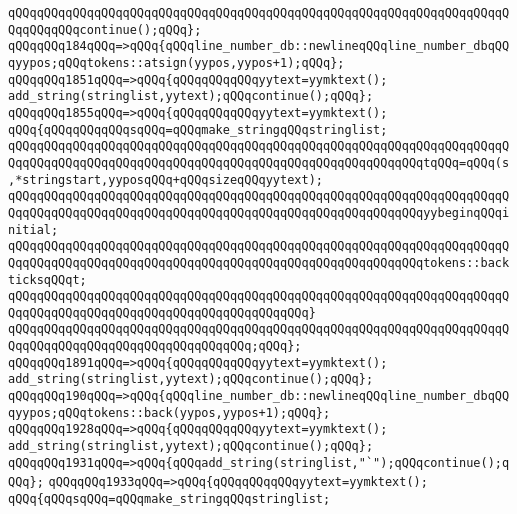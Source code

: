 \verb|qQQqqQQqqQQqqQQqqQQqqQQqqQQqqQQqqQQqqQQqqQQqqQQqqQQqqQQqqQQqqQQqqQQqqQQqqQQqqQQqcontinue();qQQq};|\newline
\verb|qQQqqQQq184qQQq=>qQQq{qQQqline_number_db::newlineqQQqline_number_dbqQQqyypos;qQQqtokens::atsign(yypos,yypos+1);qQQq};|\newline
\verb|qQQqqQQq1851qQQq=>qQQq{qQQqqQQqqQQqyytext=yymktext();|\newline
\verb|add_string(stringlist,yytext);qQQqcontinue();qQQq};|\newline
\verb|qQQqqQQq1855qQQq=>qQQq{qQQqqQQqqQQqyytext=yymktext();|\newline
\verb|qQQq{qQQqqQQqqQQqsqQQq=qQQqmake_stringqQQqstringlist;|\newline
\verb|qQQqqQQqqQQqqQQqqQQqqQQqqQQqqQQqqQQqqQQqqQQqqQQqqQQqqQQqqQQqqQQqqQQqqQQqqQQqqQQqqQQqqQQqqQQqqQQqqQQqqQQqqQQqqQQqqQQqqQQqqQQqqQQqtqQQq=qQQq(s,*stringstart,yyposqQQq+qQQqsizeqQQqyytext);|\newline
\verb|qQQqqQQqqQQqqQQqqQQqqQQqqQQqqQQqqQQqqQQqqQQqqQQqqQQqqQQqqQQqqQQqqQQqqQQqqQQqqQQqqQQqqQQqqQQqqQQqqQQqqQQqqQQqqQQqqQQqqQQqqQQqqQQqyybeginqQQqinitial;|\newline
\verb|qQQqqQQqqQQqqQQqqQQqqQQqqQQqqQQqqQQqqQQqqQQqqQQqqQQqqQQqqQQqqQQqqQQqqQQqqQQqqQQqqQQqqQQqqQQqqQQqqQQqqQQqqQQqqQQqqQQqqQQqqQQqqQQqtokens::backticksqQQqt;|\newline
\verb|qQQqqQQqqQQqqQQqqQQqqQQqqQQqqQQqqQQqqQQqqQQqqQQqqQQqqQQqqQQqqQQqqQQqqQQqqQQqqQQqqQQqqQQqqQQqqQQqqQQqqQQqqQQqqQQq}|\newline
\verb|qQQqqQQqqQQqqQQqqQQqqQQqqQQqqQQqqQQqqQQqqQQqqQQqqQQqqQQqqQQqqQQqqQQqqQQqqQQqqQQqqQQqqQQqqQQqqQQqqQQqqQQq;qQQq};|\newline
\verb|qQQqqQQq1891qQQq=>qQQq{qQQqqQQqqQQqyytext=yymktext();|\newline
\verb|add_string(stringlist,yytext);qQQqcontinue();qQQq};|\newline
\verb|qQQqqQQq190qQQq=>qQQq{qQQqline_number_db::newlineqQQqline_number_dbqQQqyypos;qQQqtokens::back(yypos,yypos+1);qQQq};|\newline
\verb|qQQqqQQq1928qQQq=>qQQq{qQQqqQQqqQQqyytext=yymktext();|\newline
\verb|add_string(stringlist,yytext);qQQqcontinue();qQQq};|\newline
\verb|qQQqqQQq1931qQQq=>qQQq{qQQqadd_string(stringlist,"`");qQQqcontinue();qQQq};|\newline
\verb|qQQqqQQq1933qQQq=>qQQq{qQQqqQQqqQQqyytext=yymktext();|\newline
\verb|qQQq{qQQqsqQQq=qQQqmake_stringqQQqstringlist;|\newline
